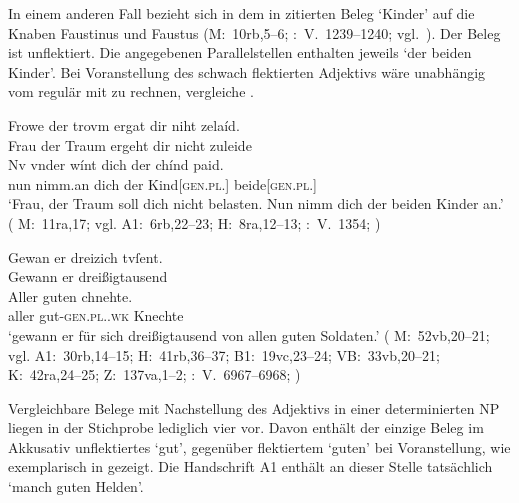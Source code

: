 In einem anderen Fall bezieht sich in dem in  zitierten
Beleg  `Kinder' auf die Knaben Faustinus und Faustus (M:~10rb,5--6;
\KC:~V.~1239--1240; vgl.~\cite[104]{schroeder1895}). Der Beleg ist unflektiert.
Die angegebenen Parallelstellen enthalten jeweils  `der
beiden Kinder'. Bei Voranstellung des schwach flektierten
Adjektivs wäre unabhängig vom  regulär mit
 zu rechnen, vergleiche .

\begin{exe}
\ex \label{ex:chindpaid}
\begin{xlist}
	\ex \label{ex:chindpaid_1}
		\gll Frowe der trovm ergat dir niht zelaíd. \\
			Frau der Traum ergeht dir nicht zuleide \\
	\sn \gll Nv {vnder wínt} dich der chínd paid. \\
			nun nimm.an dich der Kind[\textsc{gen.pl.\NeutM}]
			beide[\textsc{gen.pl.\NeutM}] \\
		\trans `Frau, der Traum soll dich nicht belasten. Nun nimm dich der
			beiden Kinder an.'
			(%
				M:~11ra,17; vgl.
				A1:~6rb,22--23;
				H:~8ra,12--13;
				\KC:~V.~1354;
				\cite[106]{schroeder1895}%
			)

	\ex \label{ex:chindpaid_2}
		\gll Gewan er {dreizich tvſent}. \\
			Gewann er dreißigtausend \\
	\sn \gll Aller guten chnehte. \\
			aller gut-\textsc{gen.pl.\MascM.wk} Knechte \\
		\trans `gewann er  für sich dreißigtausend
			von allen guten Soldaten.'
			(%
				M:~52vb,20--21; vgl.
				A1:~30rb,14--15;
				H:~41rb,36--37;
				B1:~19vc,23--24;
				VB:~33vb,20--21;
				K:~42ra,24--25;
				Z:~137va,1--2;
				\KC:~V.~6967--6968;
				\cite[209]{schroeder1895}%
			)
\end{xlist}
\end{exe}

Vergleichbare Belege mit Nachstellung des Adjektivs in
einer determinierten NP liegen in der Stichprobe lediglich
vier vor. Davon enthält der einzige Beleg im Akkusativ 
unflektiertes  `gut', gegenüber flektiertem  `guten' bei
Voranstellung, wie exemplarisch in  gezeigt. Die Handschrift
A1 enthält an dieser Stelle %
tatsächlich  `manch guten Helden'.

